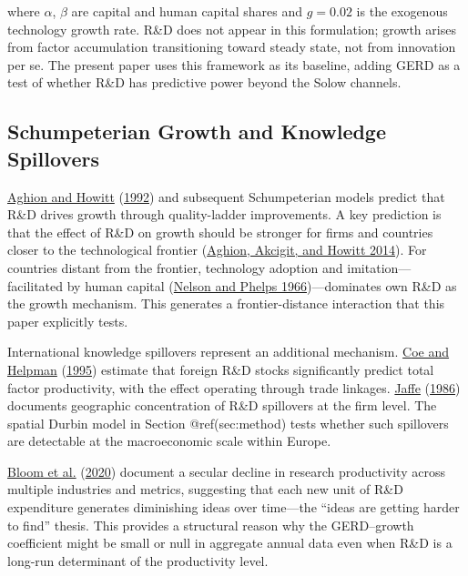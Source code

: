 \documentclass[
  11pt,
]{article}
\begin{document}
where \(\alpha\), \(\beta\) are capital and human capital shares and \(g = 0.02\) is the exogenous technology growth rate. R\&D does not appear in this formulation; growth arises from factor accumulation transitioning toward steady state, not from innovation per se. The present paper uses this framework as its baseline, adding GERD as a test of whether R\&D has predictive power beyond the Solow channels.

\hypertarget{schumpeterian-growth-and-knowledge-spillovers}{%
\subsection{Schumpeterian Growth and Knowledge Spillovers}\label{schumpeterian-growth-and-knowledge-spillovers}}

\protect\hyperlink{ref-aghion1992}{Aghion and Howitt} (\protect\hyperlink{ref-aghion1992}{1992}) and subsequent Schumpeterian models predict that R\&D drives growth through quality-ladder improvements. A key prediction is that the effect of R\&D on growth should be stronger for firms and countries closer to the technological frontier (\protect\hyperlink{ref-aghion2014}{Aghion, Akcigit, and Howitt 2014}). For countries distant from the frontier, technology adoption and imitation---facilitated by human capital (\protect\hyperlink{ref-nelsonphelps1966}{Nelson and Phelps 1966})---dominates own R\&D as the growth mechanism. This generates a frontier-distance interaction that this paper explicitly tests.

International knowledge spillovers represent an additional mechanism. \protect\hyperlink{ref-coe1995}{Coe and Helpman} (\protect\hyperlink{ref-coe1995}{1995}) estimate that foreign R\&D stocks significantly predict total factor productivity, with the effect operating through trade linkages. \protect\hyperlink{ref-jaffe1986}{Jaffe} (\protect\hyperlink{ref-jaffe1986}{1986}) documents geographic concentration of R\&D spillovers at the firm level. The spatial Durbin model in Section @ref(sec:method) tests whether such spillovers are detectable at the macroeconomic scale within Europe.

\protect\hyperlink{ref-bloom2020}{Bloom et al.} (\protect\hyperlink{ref-bloom2020}{2020}) document a secular decline in research productivity across multiple industries and metrics, suggesting that each new unit of R\&D expenditure generates diminishing ideas over time---the ``ideas are getting harder to find'' thesis. This provides a structural reason why the GERD--growth coefficient might be small or null in aggregate annual data even when R\&D is a long-run determinant of the productivity level.
\end{document}
